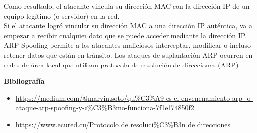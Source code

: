 \documentclass[11pt, a4paper]{report}
\begin{document}
Como resultado, el atacante vincula su dirección MAC con la dirección IP
de un equipo legítimo (o servidor) en la red. \\

Si el atacante logró vincular su dirección MAC a una dirección IP auténtica,
va a empezar a recibir cualquier dato que se puede acceder mediante la dirección
IP. \\

ARP Spoofing permite a los atacantes maliciosos interceptar, modificar o
incluso retener datos que están en tránsito. Los ataques de suplantación ARP
ocurren en redes de área local que utilizan protocolo de resolución de
direcciones (ARP).

\newpage

\textbf{Bibliografía} \\

\begin{itemize}

\item \url{https://medium.com/@marvin.soto/qu\%C3\%A9-es-el-envenenamiento-arp-
  o-ataque-arp-spoofing-y-c\%C3\%B3mo-funciona-7f1e174850f2}
\item \url{https://www.ecured.cu/Protocolo de resoluci\%C3\%B3n de direcciones}
\end{itemize}
\end{document}
